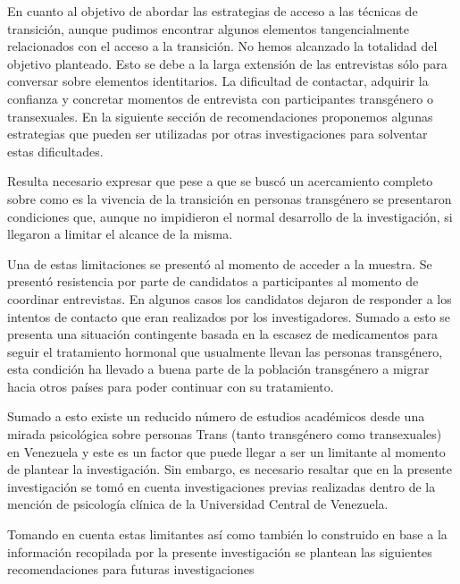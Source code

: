 En cuanto al objetivo de abordar las estrategias de acceso a las técnicas de
transición, aunque pudimos encontrar algunos elementos tangencialmente
relacionados con el acceso a la transición. No hemos alcanzado la totalidad del
objetivo planteado. Esto se debe a la larga extensión de las entrevistas sólo
para conversar sobre elementos identitarios. La dificultad de contactar,
adquirir la confianza y concretar momentos de entrevista con participantes
transgénero o transexuales. En la siguiente sección de recomendaciones
proponemos algunas estrategias que pueden ser utilizadas por otras
investigaciones para solventar estas dificultades.

Resulta necesario expresar que pese a que se buscó un acercamiento completo
sobre como es la vivencia de la transición en personas transgénero se
presentaron condiciones que, aunque no impidieron el normal desarrollo de la
investigación, si llegaron a limitar el alcance de la misma.

Una de estas limitaciones se presentó al momento de acceder a la muestra. Se
presentó resistencia por parte de candidatos a participantes al momento de
coordinar entrevistas. En algunos casos los candidatos dejaron de responder a
los intentos de contacto que eran realizados por los investigadores. Sumado a
esto se presenta una situación contingente basada en la escasez de medicamentos
para seguir el tratamiento hormonal que usualmente llevan las personas
transgénero, esta condición ha llevado a buena parte de la población transgénero
a migrar hacia otros países para poder continuar con su tratamiento.

Sumado a esto existe un reducido número de estudios académicos desde una mirada
psicológica sobre personas Trans (tanto transgénero como transexuales) en
Venezuela y este es un factor que puede llegar a ser un limitante al momento de
plantear la investigación. Sin embargo, es necesario resaltar que en la presente
investigación se tomó en cuenta investigaciones previas realizadas dentro de
la mención de psicología clínica de la Universidad Central de Venezuela.

Tomando en cuenta estas limitantes así como también lo construido en base a la
información recopilada por la presente investigación se plantean las siguientes
recomendaciones para futuras investigaciones

